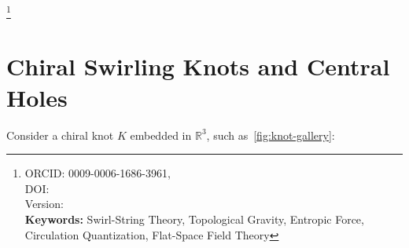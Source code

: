 \documentclass[reprint,aps,onecolumn,nofootinbib]{revtex4-2}
\newcommand{\swirlarrow}{%
    \mathchoice{\mkern-2mu\scriptstyle\boldsymbol{\circlearrowleft}}%
    {\mkern-2mu\scriptstyle\boldsymbol{\circlearrowleft}}%
    {\mkern-2mu\scriptscriptstyle\boldsymbol{\circlearrowleft}}%
    {\mkern-2mu\scriptscriptstyle\boldsymbol{\circlearrowleft}}%
}
\newcommand{\SwirlClock}{S_{(t)}^{\swirlarrow}}
\begin{document}
    \title{\papertitle }
    \author{Omar Iskandarani}
    \thanks{ORCID: 0009-0006-1686-3961,\\
            DOI: \paperdoi \\
            Version: \paperversion \\
    \textbf{Keywords:} Swirl-String Theory, Topological Gravity, Entropic Force, Circulation Quantization, Flat-Space Field Theory
    }
    \date{\today}

    \begin{abstract}
    We derive long-range gravitational attraction in Swirl--String Theory (SST) as a direct consequence of \emph{chiral swirling knots}---topological vortex filaments such as the trefoil (\(3_1\)), cinquefoil (\(5_1\)), (\(5_2\)), and stevedore (\(6_1\)).
    Each knot encloses a central rotational line, which acts as an anchor of circulation.
    Using Cauchy's integral theorem, we show that the circulation measured around any loop enclosing this axis is quantized by the knot's winding number.
    This quantization is expressed by the Swirl Clock \(\SwirlClock\), and its persistence explains why neutral molecules (e.g.\ H\(_2\) attract in otherwise flat space: their knots are connected via the same central swirl line extending beyond the equal-pressure boundary.
    \end{abstract}


    \maketitle


\section{Chiral Swirling Knots and Central Holes}
    Consider a chiral knot $K$ embedded in $\mathbb{R}^3$, such as~\ref{fig:knot-gallery}:
\end{document}
